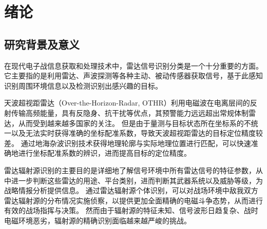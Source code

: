 \chapter{绪论}
\label{sec:intro}
\section{研究背景及意义}







在现代电子战信息获取和处理技术中，雷达信号识别分类是一个十分重要的方面。它主要指的是利用雷达、声波探测等各种主动、被动传感器获取信号，基于此感知识别周围环境信息以及检测识别出感兴趣的目标。

天波超视距雷达（Over-the-Horizon-Radar, OTHR）利用电磁波在电离层间的反射传输高频能量，具有反隐身、抗干扰等优点，其预警能力远远超出常规体制雷达，从而受到越来越多国家的关注。
但是由于量测与目标状态所在坐标系的不统一以及无法实时获得准确的坐标配准系数，导致天波超视距雷达的目标定位精度较差。
通过地海杂波识别技术获得地理轮廓与实际地理位置进行匹配，可以快速准确地进行坐标配准系数的辨识，进而提高目标的定位精度。

雷达辐射源识别的主要目的是详细地了解信号环境中所有雷达信号的特征参数，从中进一步判断这些雷达的用途、平台类别，进而判断其武器系统以及威胁等级，为战略情报分析提供信息。
通过雷达辐射源个体识别，可以对战场环境中敌我双方雷达辐射源的分布情况实施侦察，以提供更加全面精确的电磁斗争态势，从而进行有效的战场指挥与决策。
然而由于辐射源的特征未知、信号波形日趋复杂、战时电磁环境恶劣，辐射源的精确识别面临越来越严峻的挑战。

